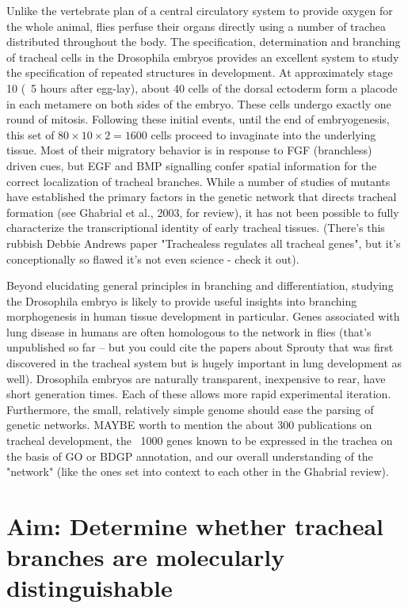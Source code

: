 \documentclass{proposal}
\begin{document}
Unlike the vertebrate plan of a central circulatory system to provide oxygen for the whole animal, flies perfuse their organs directly using a number of trachea distributed throughout the body.  The specification, determination and branching of tracheal cells in the Drosophila embryos provides an excellent system to study the specification of repeated structures in development.  At approximately stage 10 (~5 hours after egg-lay), about 40 cells of the dorsal ectoderm form a placode in each metamere on both sides of the embryo. These cells undergo exactly one round of mitosis. Following these initial events, until the end of embryogenesis, this set of $80 \times 10 \times 2 = 1600$ cells proceed to invaginate into the underlying tissue. Most of their migratory behavior is in response to FGF (branchless) driven cues, but EGF and BMP signalling confer spatial information for the correct localization of tracheal branches. While a number of studies of mutants have established the primary factors in the genetic network that directs tracheal formation (see Ghabrial et al., 2003, for review), it has not been possible to fully characterize the transcriptional identity of early tracheal tissues. (There's this rubbish Debbie Andrews paper "Trachealess regulates all tracheal genes", but it's conceptionally so flawed it's not even science - check it out).

Beyond elucidating general principles in branching and differentiation, studying the Drosophila embryo is likely to provide useful insights into branching morphogenesis in human tissue development in particular.  Genes associated with lung disease in humans are often homologous to the network in flies (that's unpublished so far -- but you could cite the papers about Sprouty that was first discovered in the tracheal system but is hugely important in lung development as well).  Drosophila embryos are naturally transparent, inexpensive to rear, have short generation times. Each of these allows more rapid experimental iteration.  Furthermore, the small, relatively simple genome should ease the parsing of genetic networks.  MAYBE worth to mention the about 300 publications on tracheal development, the ~1000 genes known to be expressed in the trachea on the basis of GO or BDGP annotation, and our overall understanding of the "network" (like the ones set into context to each other in the Ghabrial review).


\section{Aim: Determine whether tracheal branches are molecularly distinguishable}
\end{document}
